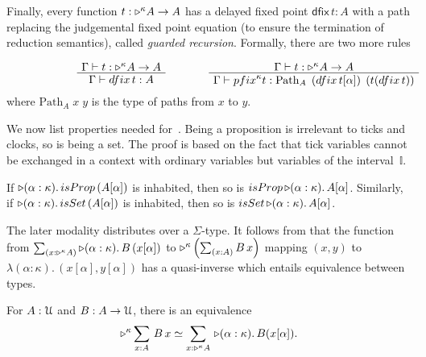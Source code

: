 \documentclass[a4paper,UKenglish,numberwithinsect,cleveref,thm-restate]{lipics-v2021}
\numberwithin{equation}{section}
\theoremstyle{definition}
\theoremstyle{plain}
\begin{document}
  Finally, every function $t : \mathord{\triangleright}^\kappa A \to A$ has a delayed fixed point $\mathsf{dfix}\,t : A$ with a path replacing the judgemental fixed point equation (to ensure the termination of reduction semantics), called \emph{guarded recursion}.
Formally, there are two more rules
\[
  \begin{minipage}{0.47\linewidth}
    \begin{prooftree}
      \AxiomC{$\Gamma \vdash t : \laterp^\kappa A \to A$}
      \UnaryInfC{$\Gamma \vdash \mathsf{dfix}\,t : A$}
    \end{prooftree}
  \end{minipage}
  \begin{minipage}{0.47\linewidth}
    \begin{prooftree}
      \AxiomC{$\Gamma \vdash t : \laterp^\kappa A \to A$}
      \UnaryInfC{$\Gamma \vdash \mathsf{pfix}^\kappa t : \mathrm{Path}_A\;\left(\mathsf{dfix}\,t[\alpha]\right)\;\left(t(\mathsf{dfix}\,t)\right)$}
    \end{prooftree}
  \end{minipage}
\]
where $\mathrm{Path}_A\;x\;y$ is the type of paths from $x$ to $y$.

We now list properties needed for~.
Being a proposition is irrelevant to ticks and clocks, so is being a set.
The proof is based on the fact that tick variables cannot be exchanged in a context with ordinary variables but  variables of the interval~$\mathbb{I}$.
\begin{lemma}
  If $\laterp (\alpha : \kappa).\, \mathsf{isProp}\,(A [\alpha])$ is inhabited, then so is $\mathsf{isProp}\,\laterp(\alpha: \kappa).\, A [\alpha]$. 
  Similarly, if $\laterp (\alpha : \kappa).\, \mathsf{isSet}\,(A [\alpha])$ is inhabited, then so is $\mathsf{isSet}\,\laterp(\alpha: \kappa).\, A [\alpha]$. 
\end{lemma}

The later modality distributes over a $\Sigma$-type.
It follows from that the function from $\sm{x : \laterp^\kappa A} \laterp (\alpha : \kappa).\, B\,(x[\alpha])$ to $\laterp^\kappa \left(\sm{x : A} B\,x\right)$ mapping $(x, y)$ to $\lambda (\alpha : \kappa).\, (x[\alpha], y[\alpha])$ has a quasi-inverse which entails equivalence between types.
\begin{lemma}\label{lem:later-sum}
  For $A : \mathcal{U}$ and $B : A \to \mathcal{U}$, there is an equivalence
  \begin{equation}\label{eq:later-sum}
    \eqv{\laterp^\kappa \sm{x : A} B\,x}{\sm{x : \laterp^\kappa A} \laterp (\alpha : \kappa).\, B (x [\alpha])}.
  \end{equation}
\end{lemma}
\end{document}
